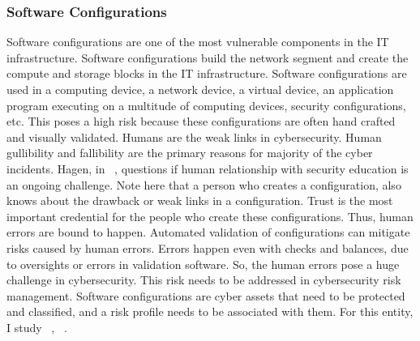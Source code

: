 \subsubsection{Software Configurations}\label{sec:asset_swconfig}
Software configurations are one of the most vulnerable components in the IT infrastructure. Software configurations build the network segment and create the compute and storage blocks in the IT infrastructure. Software configurations are used in a computing device, a network device, a virtual device, an application program executing on a multitude of computing devices, security configurations, etc. This poses a high risk because these configurations are often hand crafted and visually validated. Humans are the weak links in cybersecurity. Human gullibility and fallibility are the primary reasons for majority of the cyber incidents. Hagen, in ~\cite{5189564}, questions if human relationship with security education is an ongoing challenge. Note here that a person who creates a configuration, also knows about the drawback or weak links in a configuration. Trust is the most important credential for the people who create these configurations. Thus, human errors are bound to happen. Automated validation of configurations can mitigate risks caused by human errors. Errors happen even with checks and balances, due to oversights or errors in validation software. So, the human errors pose a huge challenge in cybersecurity. This risk needs to be addressed in cybersecurity risk management. Software configurations are cyber assets that need to be protected and classified, and a risk profile needs to be associated with them. For this entity, I study ~\cite{7795460}, ~\cite{6061419}.\\ 
